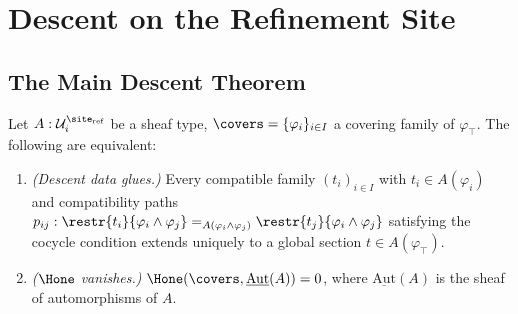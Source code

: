 \section{Descent on the Refinement Site}
\label{sec:descent-refinement}

\subsection{The Main Descent Theorem}

\begin{theorem}
\label{thm:refinement-descent}
Let $A : \mathcal{U}_i^{\site_{\mathrm{ref}}}$ be a sheaf type,
$\covers = \{\varphi_i\}_{i \in I}$ a covering family of $\varphi_\top$.
The following are equivalent:
\begin{enumerate}
\item \emph{(Descent data glues.)} Every compatible family
  $(t_i)_{i \in I}$ with $t_i \in A(\varphi_i)$ and compatibility paths
  $p_{ij} : \restr{t_i}{\varphi_i \wedge \varphi_j} =_{A(\varphi_i
  \wedge \varphi_j)} \restr{t_j}{\varphi_i \wedge \varphi_j}$
  satisfying the cocycle condition extends uniquely to a global section
  $t \in A(\varphi_\top)$.
\item \emph{($\Hone$ vanishes.)}
  $\Hone(\covers, \underline{\mathrm{Aut}}(A)) = 0$,
  where $\underline{\mathrm{Aut}}(A)$ is the sheaf of automorphisms of $A$.
\end{enumerate}
\end{theorem}

